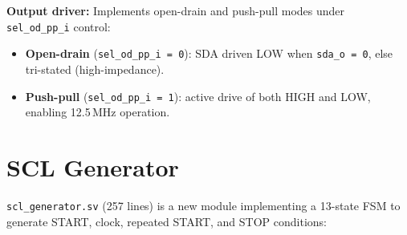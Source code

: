 \documentclass[12pt, a4paper, oneside]{report}
\newcommand{\signal}[1]{\texttt{#1}}
\newcommand{\file}[1]{\texttt{#1}}
\begin{document}
\textbf{Output driver:} Implements open-drain and push-pull modes under
\signal{sel\_od\_pp\_i} control:
\begin{itemize}
  \item \textbf{Open-drain} (\signal{sel\_od\_pp\_i\,=\,0}): SDA driven LOW when
        \signal{sda\_o\,=\,0}, else tri-stated (high-impedance).
  \item \textbf{Push-pull} (\signal{sel\_od\_pp\_i\,=\,1}): active drive of both
        HIGH and LOW, enabling 12.5\,MHz operation.
\end{itemize}

\section{SCL Generator}

\file{scl\_generator.sv} (257 lines) is a new module implementing a 13-state FSM to
generate START, clock, repeated START, and STOP conditions:
\end{document}
